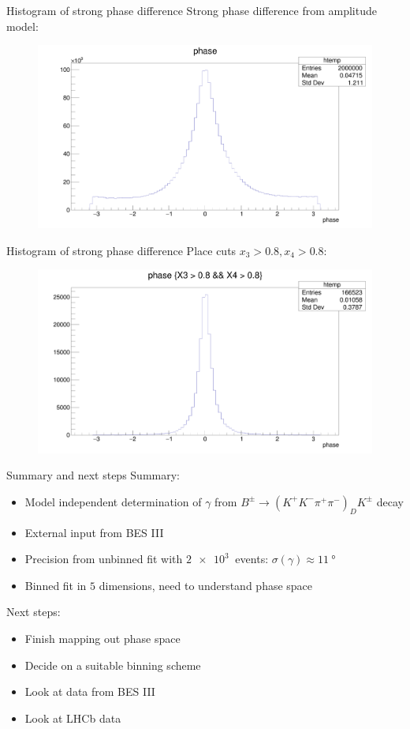 \documentclass{beamer}
\begin{document}
\begin{frame}{Histogram of strong phase difference}
  Strong phase difference from amplitude model:
  \begin{figure}
    \includegraphics[width = 1\textwidth]{strongphase.png}
  \end{figure}
\end{frame}

\begin{frame}{Histogram of strong phase difference}
  Place cuts $x_3 > 0.8, x_4 > 0.8$:
  \begin{figure}
    \includegraphics[width = 1\textwidth]{strongphasecut.png}
  \end{figure}
\end{frame}

\begin{frame}{Summary and next steps}
  Summary:
  \begin{itemize}
    \item{Model independent determination of $\gamma$ from $B^\pm\to(K^+K^-\pi^+\pi^-)_DK^\pm$ decay}
    \item{External input from BES III}
    \item{Precision from unbinned fit with $\SI{2e3}{}$ events: $\sigma(\gamma)\approx\SI{11}{\degree}$}
    \item{Binned fit in $5$ dimensions, need to understand phase space}
  \end{itemize}
  Next steps:
  \begin{itemize}
    \item{Finish mapping out phase space}
    \item{Decide on a suitable binning scheme}
    \item{Look at data from BES III}
    \item{Look at LHCb data}
  \end{itemize}
\end{frame}
\end{document}
